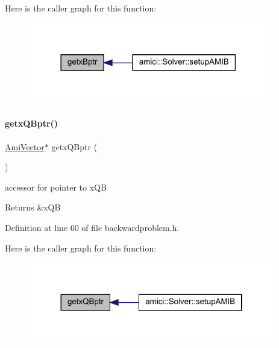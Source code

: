 Here is the caller graph for this function\+:
\nopagebreak
\begin{figure}[H]
\begin{center}
\leavevmode
\includegraphics[width=297pt]{classamici_1_1_backward_problem_afd910c853cb52a19b17ff8b65832fe2e_icgraph}
\end{center}
\end{figure}
\mbox{\label{classamici_1_1_backward_problem_a6b43b17396089785a111a5bc1fd27112}} 
\paragraph{\texorpdfstring{getx\+Q\+Bptr()}{getxQBptr()}}
{\footnotesize\ttfamily \mbox{\hyperlink{classamici_1_1_ami_vector}{Ami\+Vector}}$\ast$ getx\+Q\+Bptr (\begin{DoxyParamCaption}{ }\end{DoxyParamCaption})}

accessor for pointer to x\+QB \begin{DoxyReturn}{Returns}
\&x\+QB 
\end{DoxyReturn}


Definition at line 60 of file backwardproblem.\+h.

Here is the caller graph for this function\+:
\nopagebreak
\begin{figure}[H]
\begin{center}
\leavevmode
\includegraphics[width=305pt]{classamici_1_1_backward_problem_a6b43b17396089785a111a5bc1fd27112_icgraph}
\end{center}
\end{figure}
\mbox{\label{classamici_1_1_backward_problem_ab1f652d5ffaf80adab677b0a8393b48a}} 
